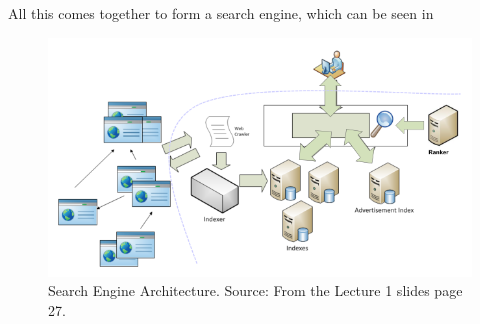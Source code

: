 	All this comes together to form a search engine, which can be seen in 
	
	\begin{figure}[H]
	\centering
	\includegraphics[width=0.7\linewidth]{Media/searchenginearchitecture}
	\caption{Search Engine Architecture. Source: From the Lecture 1 slides page 27.}
	\label{fig:searchenginearchitecture}
	\end{figure}


